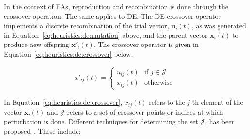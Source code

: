In the context of \acp{EA}, reproduction and recombination is done through the crossover operation. The same applies to \acs{DE}. The \acs{DE} crossover operator implements a discrete recombination of the trial vector, $\boldsymbol{u}_{i}(t)$, as was generated in Equation~\eqref{eq:heuristics:de:mutation} above, and the parent vector $\boldsymbol{x}_{i}(t)$ to produce new offspring $\boldsymbol{x}'_{i}(t)$. The crossover operator is given in Equation~\eqref{eq:heuristics:de:crossover} below.

\begin{equation}
	\label{eq:heuristics:de:crossover}
	\begin{split}
		x'_{ij}(t)=
		\begin{cases}
			u_{ij}(t) & \text{if } j \in \mathcal{J} \\
			x_{ij}(t) & \text{otherwise }
		\end{cases}
	\end{split}
\end{equation}

In Equation~\eqref{eq:heuristics:de:crossover}, $x_{ij}(t)$ refers to the $j$-th element of the vector $\boldsymbol{x}_{i}(t)$ and $\mathcal{J}$ refers to a set of crossover points or indices at which perturbation is done. Different techniques for determining the set $\mathcal{J}$, has been proposed~\cite{ref:storn:1996, ref:storn:1997}. These include:

